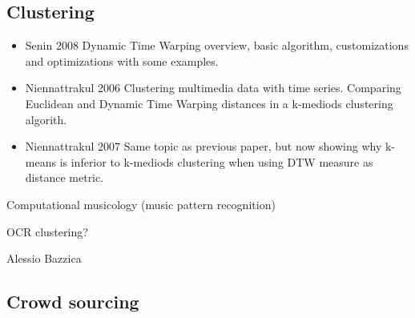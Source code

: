 \subsection{Clustering}
\begin{itemize}
    \item Senin 2008 \citep{Senin2008} Dynamic Time Warping overview, basic algorithm, customizations and optimizations with some examples.
    \item Niennattrakul 2006 \citep{Niennattrakul2006} Clustering multimedia data with time series. Comparing Euclidean and Dynamic Time Warping distances in a k-mediods clustering algorith.
    \item Niennattrakul 2007 \citep{Niennattrakul2007} Same topic as previous paper, but now showing why k-means is inferior to k-mediods clustering when using DTW measure as distance metric.
\end{itemize}

Computational musicology (music pattern recognition)

OCR clustering?

Alessio Bazzica


\subsection{Crowd sourcing}
\citep{Samiotis2020, Burghardt2017}
